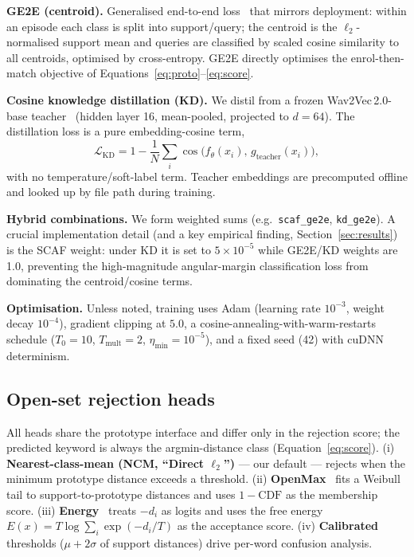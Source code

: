 \documentclass[12pt,a4paper]{article}
\newcommand{\code}[1]{\texttt{\small #1}}
\begin{document}
\textbf{GE2E (centroid).} Generalised end-to-end loss~\cite{wan2018ge2e} that
mirrors deployment: within an episode each class is split into support/query; the
centroid is the $\ell_2$-normalised support mean and queries are classified by
scaled cosine similarity to all centroids, optimised by cross-entropy. GE2E
directly optimises the enrol-then-match objective of
Equations~\eqref{eq:proto}--\eqref{eq:score}.

\textbf{Cosine knowledge distillation (KD).} We distil from a frozen
Wav2Vec\,2.0-base teacher~\cite{baevski2020wav2vec} (hidden layer 16, mean-pooled,
projected to $d{=}64$). The distillation loss is a pure embedding-cosine term,
\begin{equation}
\mathcal{L}_{\text{KD}} = 1 - \frac{1}{N}\sum_i
\cos\!\big(f_\theta(x_i),\, g_{\text{teacher}}(x_i)\big),
\label{eq:kd}
\end{equation}
with no temperature/soft-label term. Teacher embeddings are precomputed offline
and looked up by file path during training.

\textbf{Hybrid combinations.} We form weighted sums (e.g.\ \code{scaf\_ge2e},
\code{kd\_ge2e}). A crucial implementation detail (and a key empirical finding,
Section~\ref{sec:results}) is the SCAF weight: under KD it is set to
$5\times10^{-5}$ while GE2E/KD weights are 1.0, preventing the high-magnitude
angular-margin classification loss from dominating the centroid/cosine terms.

\textbf{Optimisation.} Unless noted, training uses Adam (learning rate
$10^{-3}$, weight decay $10^{-4}$), gradient clipping at $5.0$, a
cosine-annealing-with-warm-restarts schedule ($T_0{=}10$, $T_{\text{mult}}{=}2$,
$\eta_{\min}{=}10^{-5}$), and a fixed seed (42) with cuDNN determinism.

\subsection{Open-set rejection heads}\label{sec:openset}

All heads share the prototype interface and differ only in the rejection score;
the predicted keyword is always the argmin-distance class
(Equation~\eqref{eq:score}). (i) \textbf{Nearest-class-mean (NCM, ``Direct
$\ell_2$'')} --- our default --- rejects when the minimum prototype distance
exceeds a threshold. (ii) \textbf{OpenMax}~\cite{bendale2016openmax} fits a
Weibull tail to support-to-prototype distances and uses $1-\mathrm{CDF}$ as the
membership score. (iii) \textbf{Energy}~\cite{liu2020energy} treats $-d_i$ as
logits and uses the free energy $E(x)=T\log\sum_i\exp(-d_i/T)$ as the acceptance
score. (iv) \textbf{Calibrated} thresholds ($\mu+2\sigma$ of support distances)
drive per-word confusion analysis.
\end{document}
